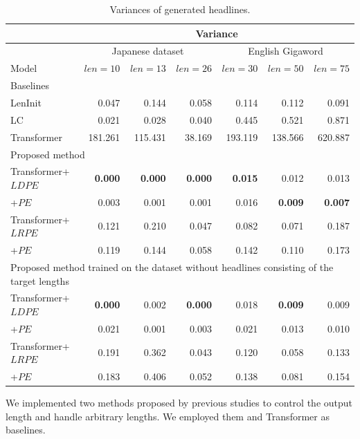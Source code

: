 \documentclass[11pt,a4paper]{article}
\begin{document}
\begin{table}[!t]
  \centering
  \footnotesize
  \begin{tabular}{| l | r r r | r r r |} \hline
  & \multicolumn{6}{c|}{Variance} \\ \hline
  & \multicolumn{3}{c|}{Japanese dataset} & \multicolumn{3}{c|}{English Gigaword} \\ \hline
  Model & $len = 10$ & $len = 13$ & $len = 26$ & $len = 30$ & $len = 50$ & $len = 75$ \\ \hline
  \multicolumn{7}{|l|}{Baselines} \\ \hline
  LenInit & 0.047 & 0.144 & 0.058 & 0.114 & 0.112 & 0.091 \\
  LC & 0.021 & 0.028 & 0.040 & 0.445 & 0.521 & 0.871 \\
  Transformer & 181.261 & 115.431 & 38.169 & 193.119 & 138.566 & 620.887 \\ \hline
  \multicolumn{7}{|l|}{Proposed method} \\ \hline
  Transformer+$LDPE$ & {\bf 0.000} & {\bf 0.000} & {\bf 0.000} & {\bf 0.015} & 0.012 & 0.013 \\
  +$PE$ & 0.003 & 0.001 & 0.001 & 0.016 & {\bf 0.009} & {\bf 0.007} \\
  Transformer+$LRPE$ & 0.121 & 0.210 & 0.047 & 0.082 & 0.071 & 0.187 \\
  +$PE$ & 0.119 & 0.144 & 0.058 & 0.142 & 0.110 & 0.173 \\ \hline
  \multicolumn{7}{|l|}{Proposed method trained on the dataset without headlines consisting of the target lengths} \\ \hline
  Transformer+$LDPE$ & {\bf 0.000} & 0.002 & {\bf 0.000} & 0.018 & {\bf 0.009} & 0.009 \\
  +$PE$ & 0.021 & 0.001 & 0.003 & 0.021 & 0.013 & 0.010 \\
  Transformer+$LRPE$ & 0.191 & 0.362 & 0.043 & 0.120 & 0.058 & 0.133 \\
  +$PE$ & 0.183 & 0.406 & 0.052 & 0.138 & 0.081 & 0.154 \\ \hline
  \end{tabular}
  \caption{Variances of generated headlines.\label{tab:var_length}}
\end{table}

We implemented two methods proposed by previous studies to control the output length and handle arbitrary lengths.
We employed them and Transformer as baselines.
\end{document}
